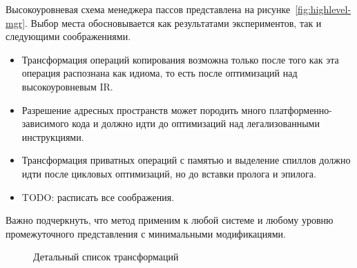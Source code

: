 Высокоуровневая схема менеджера пассов представлена на рисунке~\cref{fig:highlevel-mgr}. Выбор места обосновывается как результатами экспериментов, так и следующими соображениями.

\begin{itemize}
\item Трансформация операций копирования возможна только после того как эта операция распознана как идиома, то есть после оптимизаций над высокоуровневым IR.
\item Разрешение адресных пространств может породить много платформенно-зависимого кода и должно идти до оптимизаций над легализованными инструкциями.
\item Трансформация приватных операций с памятью и выделение спиллов должно идти после цикловых оптимизаций, но до вставки пролога и эпилога.
\item TODO: расписать все соображения.
\end{itemize}

Важно подчеркнуть, что метод применим к любой системе и любому уровню промежуточного представления с минимальными модификациями. 

\begin{figure}[ht]
    \caption{Детальный список трансформаций}\label{fig:passmgr}
\end{figure}

